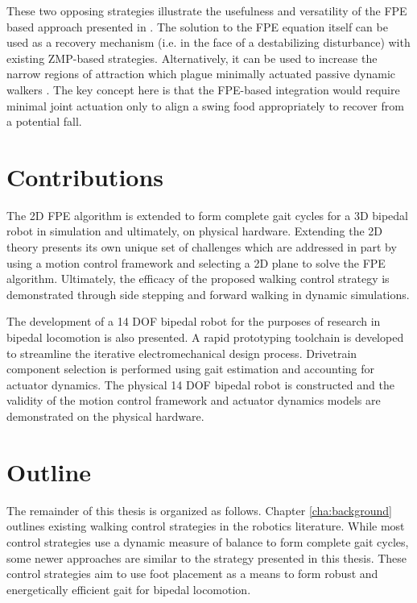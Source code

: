 These two opposing strategies illustrate the usefulness and versatility of the FPE based approach presented in \cite{Wight:2008vt}. The solution to the FPE equation itself can be used as a recovery mechanism (i.e. in the face of a destabilizing disturbance) with existing ZMP-based strategies. Alternatively, it can be used to increase the narrow regions of attraction which plague minimally actuated passive dynamic walkers \cite{Goswami:1996gn,Asano:2000wi,Kuo:1999tn}. The key concept here is that the FPE-based integration would require minimal joint actuation only to align a swing food appropriately to recover from a potential fall. 

\section{Contributions} %
\label{sec:contributions}

The 2D FPE algorithm is extended to form complete gait cycles for a 3D bipedal robot in simulation and ultimately, on physical hardware. Extending the 2D theory presents its own unique set of challenges which are addressed in part by using a motion control framework and selecting a 2D plane to solve the FPE algorithm. Ultimately, the efficacy of the proposed walking control strategy is demonstrated through side stepping and forward walking in dynamic simulations. 

The development of a 14 DOF bipedal robot for the purposes of research in bipedal locomotion is also presented. A rapid prototyping toolchain is developed to streamline the iterative electromechanical design process. Drivetrain component selection is performed using gait estimation and accounting for actuator dynamics. The physical 14 DOF bipedal robot is constructed and the validity of the motion control framework and actuator dynamics models are demonstrated on the physical hardware. 

\section{Outline} %
\label{sec:outline}
The remainder of this thesis is organized as follows. Chapter \ref{cha:background} outlines existing walking control strategies in the robotics literature. While most control strategies use a dynamic measure of balance to form complete gait cycles, some newer approaches are similar to the strategy presented in this thesis. These control strategies aim to use foot placement as a means to form robust and energetically efficient gait for bipedal locomotion. 

